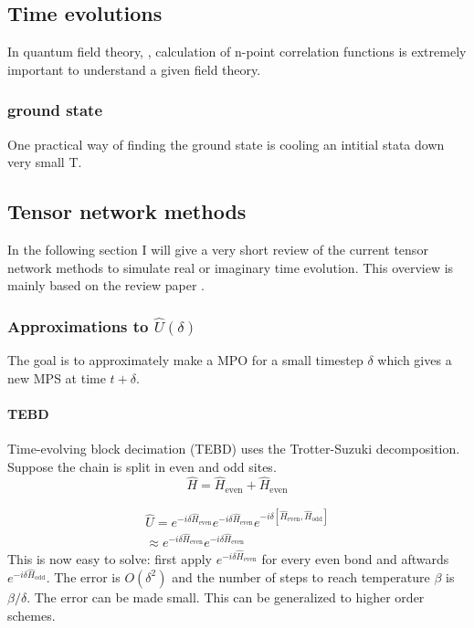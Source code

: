 \subsection{Time evolutions}
In quantum field theory, , calculation of n-point correlation functions is extremely important to understand a given field theory.

\subsubsection{ground state}
One practical way of finding the ground state is cooling an intitial stata down very small T.

\subsection{Tensor network methods}
In the following section I will give a very short review of the current tensor network methods to simulate real or imaginary time evolution. This overview is mainly based on the review paper \cite{Paeckel2019}.


\subsubsection{Approximations to  \texorpdfstring{$ \hat{U}(\delta)$}{U}   }
The goal is to approximately make a MPO for a small timestep $\delta$ which gives a new MPS at time $t+\delta$.
\paragraph{TEBD}\label{para:TEBD}
Time-evolving block decimation (TEBD)  uses the Trotter-Suzuki decomposition. Suppose the chain is split in even and odd sites.
\begin{equation}
    \hat{H} = \hat{H}_{\text{even}}+\hat{H}_{\text{even}}
\end{equation}

\begin{equation}\label{trotter_exp}
    \begin{split}
        \hat{U} = e^{-i \delta \hat{H}_{\text{even}}}  e^{-i \delta \hat{H}_{\text{even}} }e^{-i \delta \left[ \hat{H}_{\text{even}}, \hat{H}_{\text{odd}} \right] }\\
        \approx e^{-i \delta \hat{H}_{\text{even}}}  e^{-i \delta \hat{H}_{\text{even}} }
    \end{split}
\end{equation}
This is now easy to solve: first apply $e^{-i \delta \hat{H}_{\text{even}}}$ for every even bond and aftwards  $e^{-i \delta \hat{H}_{\text{odd}}}$. The error is $O(\delta^2)$ and the number of steps to reach temperature $\beta$ is $\beta / \delta$. The error can be made small. This can be generalized to higher order schemes.

